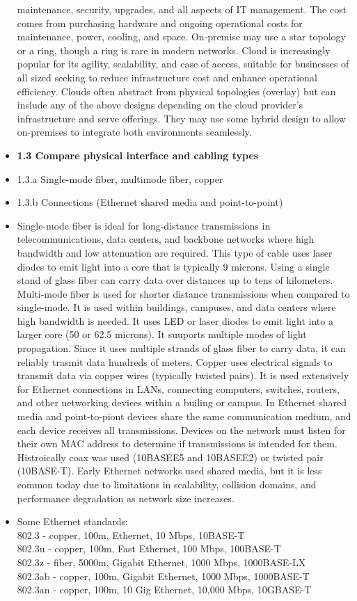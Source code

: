 \documentclass{article}
\begin{document}
\begin{itemize}
maintenance, security, upgrades, and all aspects of IT management. The cost comes from purchasing hardware and ongoing operational costs for maintenance, power, cooling, and space. On-premise may use a star topology or a ring, though a ring is rare in modern networks. Cloud is increasingly popular for its agility, scalability, and ease of access, suitable for businesses of all sized seeking to reduce infrastructure cost and enhance operational efficiency. Clouds often abstract from physical topologies (overlay) but can inslude any of the above designs depending on the cloud provider's infrastructure and serve offerings. They may use some hybrid design to allow on-premises to integrate both environments seamlessly.
  
  \item \textbf{1.3 Compare physical interface and cabling types}
  \item 1.3.a Single-mode fiber, multimode fiber, copper
  \item 1.3.b Connections (Ethernet shared media and point-to-point)
  	\item[] Single-mode fiber is ideal for long-distance transmissions in telecommunications, data centers, and backbone networks where high bandwidth and low attenuation are required. This type of cable uses laser diodes to emit light into a core that is typically 9 microns. Using a single stand of glass fiber can carry data over distances up to tens of kilometers. Multi-mode fiber is used for shorter distance transmissions when compared to single-mode. It is used within buildings, campuses, and data centers where high bandwidth is needed. It uses LED or laser diodes to emit light into a larger core (50 or 62.5 microns). It suuports multiple modes of light propagation. Since it uses multiple strands of glass fiber to carry data, it can reliably trasmit data hundreds of meters. Copper uses electrical signals to transmit data via copper wires (typically twisted pairs). It is used extensively for Ethernet connections in LANs, connecting computers, switches, routers, and other networking devices within a builing or campus. In Ethernet shared media and point-to-piont devices share the same communication medium, and each device receives all transmissions. Devices on the network must listen for their own MAC address to determine if transmissions is intended for them. Histroically coax was used (10BASEE5 and 10BASEE2) or twisted pair (10BASE-T). Early Ethernet networks used shared media, but it is less common today due to limitations in scalability, collision domains, and performance degradation as network size increases.
  	\item[] Some Ethernet standards:\\
		802.3 - copper, 100m, Ethernet, 10 Mbps, 10BASE-T\\
		802.3u - copper, 100m, Fast Ethernet, 100 Mbps, 100BASE-T\\
		802.3z - fiber, 5000m, Gigabit Ethernet, 1000 Mbps, 1000BASE-LX\\
		802.3ab - copper, 100m, Gigabit Ethernet, 1000 Mbps, 1000BASE-T\\
		802.3an - copper, 100m, 10 Gig Ethernet, 10,000 Mbps, 10GBASE-T\\
  	

\end{itemize}
\end{document}
